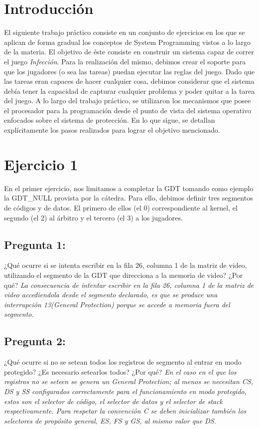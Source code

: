 \documentclass[10pt, a4paper]{article}
\begin{document}
\section{Introducci\'on}
El siguiente trabajo práctico consiste en un conjunto de ejercicios en los que se aplican de forma gradual los conceptos de System Programming vistos a lo largo de la materia. El objetivo de éste consiste en construir un sistema capaz de correr el juego \textit{Infección}. Para la realización del mismo, debimos crear el soporte para que los jugadores (o sea las tareas) puedan ejecutar las reglas del juego. Dado que las tareas eran capaces de hacer cualquier cosa, debimos considerar que el sistema debía tener la capacidad de capturar cualquier problema y poder quitar a la tarea del juego.\newline
A lo largo del trabajo práctico, se utilizaron los mecanismos que posee el procesador para la programación desde el punto de vista del sistema operativo enfocados sobre el sistema de protección. En lo que sigue, se detallan explícitamente los pasos realizados para lograr el objetivo mencionado.

\section{Ejercicio 1}

En el primer ejercicio, nos limitamos a completar la GDT tomando como ejemplo la GDT\_NULL provista por la cátedra. Para ello, debimos definir tres segmentos de códigos y de datos. El primero de ellos (el 0) correspondiente al kernel, el segundo (el 2) al árbitro y el tercero (el 3) a los jugadores.\newline
{\subsection{Pregunta 1:}} ¿Qué ocurre si se intenta escribir en la fila 26, columna 1 de la matriz de video, utilizando el segmento de la GDT que direcciona a la memoria de video? ¿Por qué?\newline
\newline
\textit{La consecuencia de intentar escribir en la fila 26, columna 1 de la matriz de video accediendola desde el segmento declarado, es que se produce una interrupción 13(General Protection) porque se accede a memoria fuera del segmento.}\newline
\newline
{\subsection{Pregunta 2:}} ¿Qué ocurre si no se setean todos los registros de segmento al entrar en modo protegido? ¿Es necesario setearlos todos? ¿Por qué?\newline
\textit{En el caso en el que los registros no se seteen se genera un General Protection; al menos se necesitan CS, DS y SS configurados correctamente para el funcionamiento en modo protegido, estos son el selector de c\'odigo, el selector de datos y el selector de stack respectivamente. Para respetar la convenci\'on C se deben inicializar tambi\'en los selectores de prop\'osito general, ES, FS y GS, al mismo valor que DS.}
\end{document}
